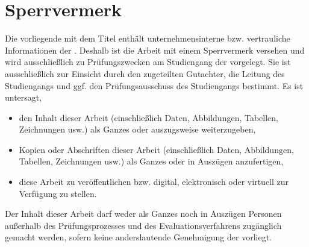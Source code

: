 \section*{Sperrvermerk}

Die vorliegende \art\/ mit dem Titel {\itshape{}\titel\/} enthält unternehmensinterne bzw. vertrauliche Informationen der \firma. Deshalb ist die Arbeit mit einem Sperrvermerk versehen und wird ausschließlich zu Prüfungszwecken am Studiengang \studienfach\/ der \hochschule\/ \campus\/ vorgelegt. Sie ist ausschließlich zur Einsicht durch den zugeteilten Gutachter, die Leitung des Studiengangs und ggf. den Prüfungsausschuss des Studiengangs bestimmt.  Es ist untersagt,
\begin{itemize}
  \item den Inhalt dieser Arbeit (einschließlich Daten, Abbildungen, Tabellen, Zeichnungen usw.) als Ganzes oder auszugsweise weiterzugeben,
  \item Kopien oder Abschriften dieser Arbeit (einschließlich Daten, Abbildungen, Tabellen, Zeichnungen usw.) als Ganzes oder in Auszügen anzufertigen,
  \item diese Arbeit zu veröffentlichen bzw. digital, elektronisch oder virtuell zur Verfügung zu stellen.
\end{itemize}
Der Inhalt dieser Arbeit darf weder als Ganzes noch in Auszügen Personen außerhalb des Prüfungsprozesses und des Evaluationsverfahrens zugänglich gemacht werden, sofern keine anderslautende Genehmigung der \firma vorliegt.
